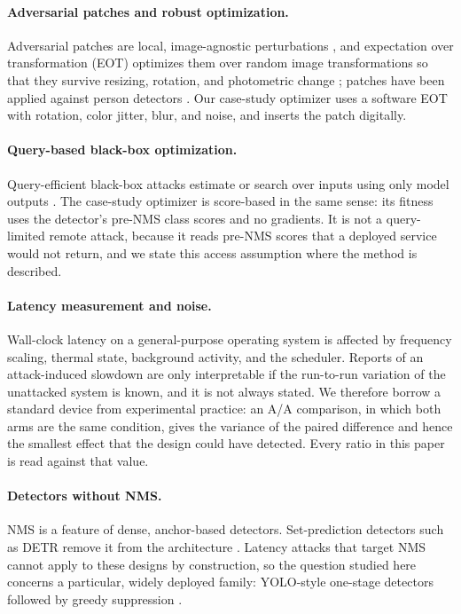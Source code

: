 \documentclass[a4paper,fleqn]{cas-dc}
\begin{document}
\paragraph{Adversarial patches and robust optimization.}
Adversarial patches are local, image-agnostic perturbations \cite{brown2017patch}, and expectation over transformation (EOT) optimizes them over random image transformations so that they survive resizing, rotation, and photometric change \cite{athalye2018eot}; patches have been applied against person detectors \cite{thys2019fooling}. Our case-study optimizer uses a software EOT with rotation, color jitter, blur, and noise, and inserts the patch digitally.

\paragraph{Query-based black-box optimization.}
Query-efficient black-box attacks estimate or search over inputs using only model outputs \cite{ilyas2018blackbox}. The case-study optimizer is score-based in the same sense: its fitness uses the detector's pre-NMS class scores and no gradients. It is not a query-limited remote attack, because it reads pre-NMS scores that a deployed service would not return, and we state this access assumption where the method is described.

\paragraph{Latency measurement and noise.}
Wall-clock latency on a general-purpose operating system is affected by frequency scaling, thermal state, background activity, and the scheduler. Reports of an attack-induced slowdown are only interpretable if the run-to-run variation of the unattacked system is known, and it is not always stated. We therefore borrow a standard device from experimental practice: an A/A comparison, in which both arms are the same condition, gives the variance of the paired difference and hence the smallest effect that the design could have detected. Every ratio in this paper is read against that value.

\paragraph{Detectors without NMS.}
NMS is a feature of dense, anchor-based detectors. Set-prediction detectors such as DETR remove it from the architecture \cite{carion2020detr}. Latency attacks that target NMS cannot apply to these designs by construction, so the question studied here concerns a particular, widely deployed family: YOLO-style one-stage detectors followed by greedy suppression \cite{redmon2016yolo,neubeck2006nms}.
\end{document}
